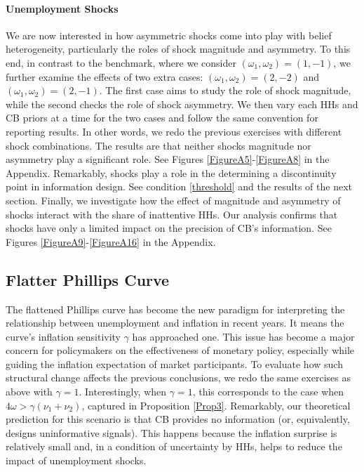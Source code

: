 \documentclass[12pt,a4paper]{article}
\begin{document}
\paragraph{Unemployment Shocks}
We are now interested in how asymmetric shocks come into play with belief heterogeneity, particularly the roles of shock magnitude and asymmetry. To this end, in contrast to the benchmark, where we consider $(\omega_1,\omega_2)=(1,-1)$, we further examine the effects of two extra cases: $(\omega_1,\omega_2)=(2,-2)$ and $(\omega_1,\omega_2)=(2,-1)$. The first case aims to study the role of shock magnitude, while the second checks the role of shock asymmetry. We then vary each HHs and CB priors at a time for the two cases and follow the same convention for reporting results. In other words, we redo the previous exercises with different shock combinations. The results are that neither shocks magnitude nor asymmetry play a significant role.
See Figures \ref{FigureA5}-\ref{FigureA8} in the Appendix. Remarkably, shocks play a role in the determining a discontinuity point in information design. See condition \eqref{threshold} and the results of the next section. Finally, we investigate how the effect of magnitude and asymmetry of shocks interact with the share of inattentive HHs. Our analysis confirms that shocks have only a limited impact on the precision of CB's information. See Figures \ref{FigureA9}-\ref{FigureA16} in the Appendix.


\subsection{Flatter Phillips Curve}
The flattened Phillips curve has become the new paradigm for interpreting the relationship between unemployment and inflation in recent years. It means the curve's inflation sensitivity $\gamma$ has approached one. This issue has become a major concern for policymakers on the effectiveness of monetary policy, especially while guiding the inflation expectation of market participants. To evaluate how such structural change affects the previous conclusions, we redo the same exercises as above with $\gamma=1$. Interestingly, when $\gamma=1$, this corresponds to the case when $4\omega > \gamma (\nu_1 + \nu_2)$, captured in Proposition \ref{Prop3}. Remarkably, our theoretical prediction for this scenario is that CB provides no information (or, equivalently, designs uninformative signals). This happens because the inflation surprise is relatively small and, in a condition of uncertainty by HHs, helps to reduce the impact of unemployment shocks. 
\end{document}
